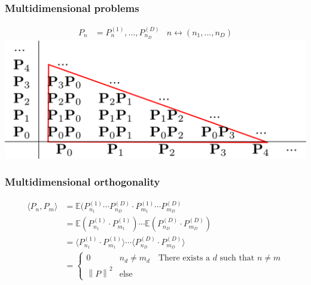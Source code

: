 \documentclass[handout]{beamer}
\newcommand{\norm}[1]{\left\lVert#1\right\rVert}
\begin{document}
\begin{frame}
 \frametitle{Multidimensional problems}
  \begin{align*}
  P_n &= P^{(1)}_n, ..., P^{(D)}_{n_D}
  & n\longleftrightarrow (n_1, ..., n_D)
  \end{align*}
  \pause
  \includegraphics[width=\textwidth]{multidim.png}
   
 \end{frame}


\begin{frame}
 \frametitle{Multidimensional orthogonality}
\begin{align*}
 \langle P_n, P_m\rangle &= \mathbb{E}(P_{n_1}^{(1)}\cdots P_{n_D}^{(D)}\cdot P_{m_1}^{(1)}\cdots P_{m_D}^{(D)}\\
  &= \mathbb{E}(P_{n_1}^{(1)}\cdot P_{m_1}^{(1)})\cdots \mathbb{E}(P_{n_D}^{(D)}\cdot P_{m_D}^{(D)}) \\
  &= \langle P_{n_1}^{(1)}\cdot P_{m_1}^{(1)} \rangle\cdots  \langle P_{n_D}^{(D)}\cdot P_{m_D}^{(D)} \rangle \\
  &= \begin{cases}
       0 & n_d \neq m_d \quad \text{There exists a } d \text{ such that }n \neq m\\
      \norm{P}^2 & \text{else} 
     \end{cases}
\end{align*}

 \end{frame}
\end{document}
